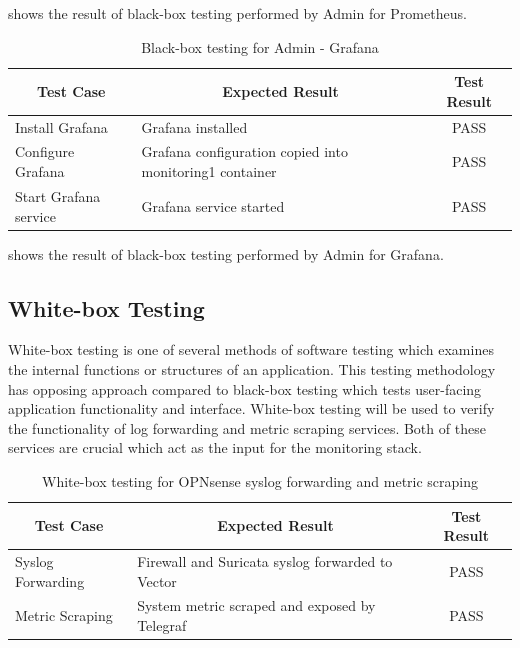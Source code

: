 \documentclass[../index.tex]{subfiles}
\begin{document}
 shows the result of black-box testing performed by Admin for
Prometheus.

\begin{table}[h!]
  \begin{tabularx}{\textwidth}{|m{12em}|X|c|} 
    \hline
    \multicolumn{1}{|c|}{Test Case} & \multicolumn{1}{c|}{Expected Result} & \multicolumn{1}{c|}{Test Result} \\
    \hline
    Install Grafana                 & Grafana installed                    & PASS \\ 
    Configure Grafana               & Grafana configuration copied into monitoring1 container & PASS \\
    Start Grafana service           & Grafana service started              & PASS \\ 
    \hline
  \end{tabularx}
  \caption{Black-box testing for Admin - Grafana}
  \label{table:blackbox_grafana}
\end{table}

 shows the result of black-box testing performed by Admin for Grafana.

\subsection{White-box Testing}

White-box testing is one of several methods of software testing which examines the internal
functions or structures of an application. This testing methodology has opposing approach compared
to black-box testing which tests user-facing application functionality and interface. White-box
testing will be used to verify the functionality of log forwarding and metric scraping services.
Both of these services are crucial which act as the input for the monitoring stack.

\begin{table}[h!]
  \begin{tabularx}{\textwidth}{|m{8em}|X|c|} 
    \hline
    \multicolumn{1}{|c|}{Test Case} & \multicolumn{1}{c|}{Expected Result} & \multicolumn{1}{c|}{Test Result} \\
    \hline
    Syslog Forwarding               & Firewall and Suricata syslog forwarded to Vector & PASS \\ 
    Metric Scraping                 & System metric scraped and exposed by Telegraf & PASS \\ 
    \hline
  \end{tabularx}
  \caption{White-box testing for OPNsense syslog forwarding and metric scraping}
  \label{table:whitebox_opnsense}
\end{table}
\end{document}
